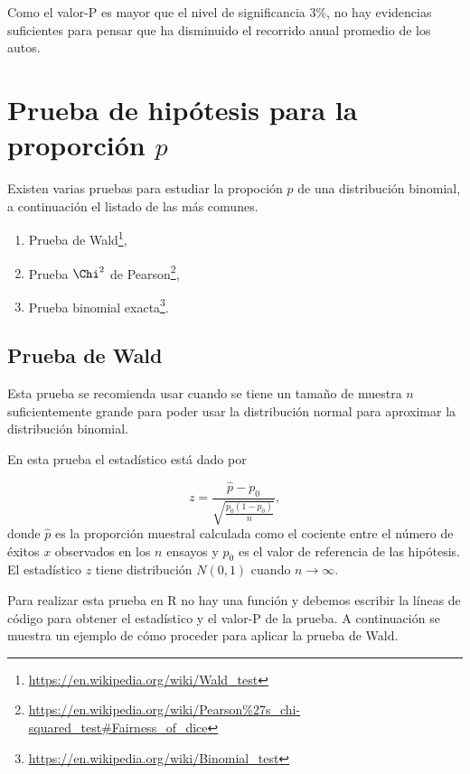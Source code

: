 \documentclass[
]{book}
\providecommand{\tightlist}{%
  \setlength{\itemsep}{0pt}\setlength{\parskip}{0pt}}
\renewcommand{\href}[2]{#2\footnote{\url{#1}}}
\begin{document}
Como el valor-P es mayor que el nivel de significancia 3\%, no hay evidencias suficientes para pensar que ha disminuido el recorrido anual promedio de los autos.

\hypertarget{prueba-de-hipuxf3tesis-para-la-proporciuxf3n-p}{%
\section{\texorpdfstring{Prueba de hipótesis para la proporción \(p\)}{Prueba de hipótesis para la proporción p}}\label{prueba-de-hipuxf3tesis-para-la-proporciuxf3n-p}}

Existen varias pruebas para estudiar la propoción \(p\) de una distribución binomial, a continuación el listado de las más comunes.

\begin{enumerate}
\def\labelenumi{\arabic{enumi}.}
\tightlist
\item
  Prueba de \href{https://en.wikipedia.org/wiki/Wald_test}{Wald},
\item
  Prueba \(\Chi^2\) de \href{https://en.wikipedia.org/wiki/Pearson\%27s_chi-squared_test\#Fairness_of_dice}{Pearson},
\item
  Prueba \href{https://en.wikipedia.org/wiki/Binomial_test}{binomial exacta}.
\end{enumerate}

\hypertarget{prueba-de-wald}{%
\subsection{Prueba de Wald}\label{prueba-de-wald}}

Esta prueba se recomienda usar cuando se tiene un tamaño de muestra \(n\) suficientemente grande para poder usar la distribución normal para aproximar la distribución binomial.

En esta prueba el estadístico está dado por

\[z=\frac{\hat{p}-p_0}{\sqrt{\frac{p_0(1-p_0)}{n}}},\]
donde \(\hat{p}\) es la proporción muestral calculada como el cociente entre el número de éxitos \(x\) observados en los \(n\) ensayos y \(p_0\) es el valor de referencia de las hipótesis. El estadístico \(z\) tiene distribución \(N(0, 1)\) cuando \(n \to \infty\).

Para realizar esta prueba en R no hay una función y debemos escribir la líneas de código para obtener el estadístico y el valor-P de la prueba. A continuación se muestra un ejemplo de cómo proceder para aplicar la prueba de Wald.
\end{document}
